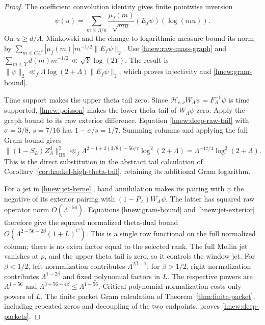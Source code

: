 \begin{proof}
The coefficient convolution identity gives finite pointwise inversion
\[
 \psi(u)=\sum_{m\le\Lambda/u}
       \frac{\mu_f(m)}{\sqrt{mu}}(E_f\psi)(\log(mu)).
\]
On $u\ge d/\Lambda$, Minkowski and the change to logarithmic
measure bound its norm by
$\sum_{m\le C\Lambda^2}|\mu_f(m)|m^{-1/2}\|E_f\psi\|_2$.
Use \eqref{hnew:raw-mass-graph} and
$\sum_{m\le Y}d(m)m^{-1/2}\ll\sqrt Y\log(2Y)$.
The result is
$\|\psi\|_2\ll_f\Lambda\log(2+\Lambda)\|E_f\psi\|_2$,
which proves injectivity and \eqref{hnew:gram-bound}.

Time support makes the upper theta tail zero.
Since $\mathcal H_{c,\nu}W_\Lambda\psi=F_\Lambda^{-1}\psi$
is time supported, \eqref{hnew:poisson} makes the lower theta
tail of $W_\Lambda\psi$ zero.  Apply the graph bound to its raw
exterior difference.  Equation \eqref{hnew:deep-raw-tail} with
$\sigma=3/8$, $s=7/16$ has $1-\sigma/s=1/7$.
Summing columns and applying the full Gram bound gives
\[
 \|(1-S_L)Z_\Lambda^{\mathrm d}\|_{\mathrm{HS}}^2
 \ll_f
 \Lambda^{2+1+2(3/8)-56/7}\log^2(2+\Lambda)
 =\Lambda^{-17/4}\log^2(2+\Lambda).
\]
This is the direct substitution in the abstract tail calculation
of Corollary~\ref{cor:hankel-high-theta-tail}, retaining its
additional Gram logarithm.

For a jet in \eqref{hnew:jet-kernel}, band annihilation makes its
pairing with $\psi$ the negative of its exterior pairing with
$(1-P_\Lambda)W_\Lambda\psi$.
The latter has squared raw operator norm $O(\Lambda^{-56})$.
Equations \eqref{hnew:gram-bound} and \eqref{hnew:jet-exterior}
therefore give the squared normalized theta-dual bound
$O(\Lambda^{2-56-2\beta}(1+L)^C)$.
This is a single row functional on the full normalized column;
there is no extra factor equal to the selected rank.
The full Mellin jet vanishes at $\rho$, and the upper theta tail
is zero, so it controls the window jet.
For $\beta<1/2$, left normalization contributes
$\Lambda^{2\beta-1}$; for $\beta>1/2$, right normalization
contributes $\Lambda^{1-2\beta}$ and fixed polynomial factors in $L$.
The respective powers are $\Lambda^{1-56}$ and
$\Lambda^{3-56-4\beta}\le\Lambda^{1-56}$.
Critical polynomial normalization costs only powers of $L$.
The finite packet Gram calculation of
Theorem~\ref{thm:finite-packet}, including repeated zeros and
decoupling of the two endpoints, proves \eqref{hnew:deep-packets}.
\end{proof}

